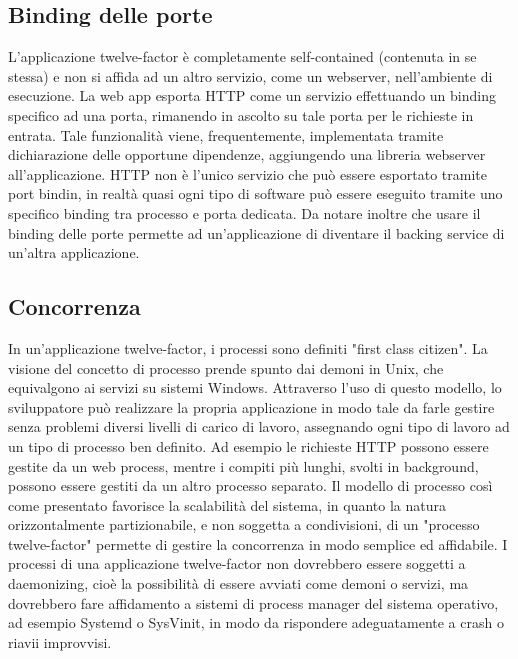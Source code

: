 \documentclass[PianoDiQualifica.tex]{subfiles}
\begin{document}
\subsection{Binding delle porte}
L'applicazione twelve-factor è completamente self-contained (contenuta in se stessa) e non si affida ad un altro servizio, come un webserver, nell'ambiente di esecuzione. La web app esporta HTTP come un servizio effettuando un binding specifico ad una porta, rimanendo in ascolto su tale porta per le richieste in entrata. Tale funzionalità viene, frequentemente, implementata tramite dichiarazione delle opportune dipendenze, aggiungendo una libreria webserver all'applicazione.
HTTP non è l'unico servizio che può essere esportato tramite port bindin, in realtà quasi ogni tipo di software può essere eseguito tramite uno specifico binding tra processo e porta dedicata.
Da notare inoltre che usare il binding delle porte permette ad un'applicazione di diventare il backing service di un'altra applicazione.
\subsection{Concorrenza}
In un'applicazione twelve-factor, i processi sono definiti "first class citizen". La visione del concetto di processo prende spunto dai demoni in Unix, che equivalgono ai servizi su sistemi Windows.
Attraverso l'uso di questo modello, lo sviluppatore può realizzare la propria applicazione in modo tale da farle gestire senza problemi diversi livelli di carico di lavoro, assegnando ogni tipo di lavoro ad un tipo di processo ben definito.
Ad esempio le richieste HTTP possono essere gestite da un web process, mentre i compiti più lunghi, svolti in background, possono essere gestiti da un altro processo separato.
Il modello di processo così come presentato favorisce la scalabilità del sistema, in quanto la natura orizzontalmente partizionabile, e non soggetta a condivisioni, di un "processo twelve-factor" permette di gestire la concorrenza in modo semplice ed affidabile. 
I processi di una applicazione twelve-factor non dovrebbero essere soggetti a daemonizing, cioè la possibilità di essere avviati come demoni o servizi, ma dovrebbero fare affidamento a sistemi di process manager del sistema operativo, ad esempio Systemd o SysVinit, in modo da rispondere adeguatamente a crash o riavii improvvisi.
\end{document}
